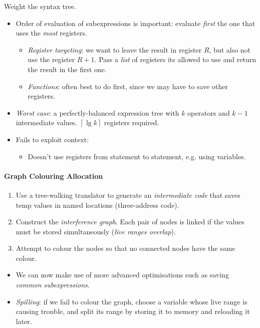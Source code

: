\documentclass[twocolumn,english]{article}
\begin{document}
Weight the syntax tree.
\begin{itemize}
\item Order of evaluation of subexpressions is important: evaluate \emph{first}
the one that uses the \emph{most} registers.
\begin{itemize}
\item \emph{Register targeting}: we want to leave the result in register
$R$, but also not use the register $R+1$. Pass a \emph{list} of
registers its allowed to use and return the result in the first one.
\item \emph{Functions}: often best to do first, since we may have to save
other registers.
\end{itemize}
\item \emph{Worst case}: a perfectly-balanced expression tree with $k$
operators and $k-1$ intermediate values. $\left\lceil \lg k\right\rceil $
registers required.
\item Fails to exploit context:
\begin{itemize}
\item Doesn't use registers from statement to statement, e.g. using variables.
\end{itemize}
\end{itemize}

\paragraph{Graph Colouring Allocation}
\begin{enumerate}
\item Use a tree-walking translator to generate an \emph{intermediate code}
that saves temp values in named locations (three-address code).
\item Construct the \emph{interference graph}. Each pair of nodes is linked
if the values must be stored simultaneously (\emph{live ranges overlap}).
\item Attempt to colour the nodes so that no connected nodes have the same
colour.
\end{enumerate}
\begin{itemize}
\item We can now make use of more advanced optimisations such as saving
\emph{common subexpressions}.
\item \emph{Spilling}: if we fail to colour the graph, choose a variable
whose live range is causing trouble, and split its range by storing
it to memory and reloading it later.
\end{itemize}
\end{document}
